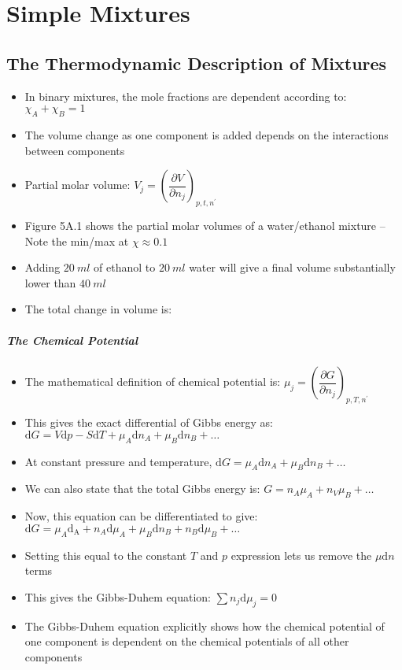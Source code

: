 \documentclass[12pt, openany, letterpaper]{memoir}
\begin{document}
\chapter{Simple Mixtures}
\section{The Thermodynamic Description of Mixtures}
\begin{itemize}
	\item In binary mixtures, the mole fractions are dependent according to: $\chi_A+\chi_B=1$
	\item The volume change as one component is added depends on the interactions between components
	\item Partial molar volume: $V_j=\left(\dfrac{\partial V}{\partial n_j}\right)_{p,t,n^\prime}$
	\item Figure 5A.1 shows the partial molar volumes of a water/ethanol mixture -- Note the min/max at $\chi\approx0.1$
	\item Adding $20~ml$ of ethanol to $20~ml$ water will give a final volume substantially lower than $40~ml$
	\item The total change in volume is:
\end{itemize}
\paragraph{The Chemical Potential}
\begin{itemize}
	\item The mathematical definition of chemical potential is: $\mu_j = \left(\dfrac{\partial G}{\partial n_j}\right)_{p,T,n^\prime}$
	\item This gives the exact differential of Gibbs energy as: $\mathrm{d}G = V\mathrm{d}p-S\mathrm{d}T+\mu_A\mathrm{d}n_A+\mu_B\mathrm{d}n_B+\ldots$
	\item At constant pressure and temperature, $\mathrm{d}G = \mu_A\mathrm{d}n_A+\mu_B\mathrm{d}n_B+\ldots$
	\item We can also state that the total Gibbs energy is: $G = n_A\mu_A + n_V\mu_B+\ldots$
	\item Now, this equation can be differentiated to give: $\mathrm{d}G = \mu_A\mathrm{d_A} + n_A\mathrm{d}\mu_A + \mu_B\mathrm{d}n_B + n_B\mathrm{d}\mu_B+\ldots$
	\item Setting this equal to the constant $T$ and $p$ expression lets us remove the $\mu\mathrm{d}n$ terms
	\item This gives the Gibbs-Duhem equation: $\displaystyle\sum n_j\mathrm{d}\mu_j = 0$
	\item The Gibbs-Duhem equation explicitly shows how the chemical potential of one component is dependent on the chemical potentials of all other components
\end{itemize}
\end{document}
